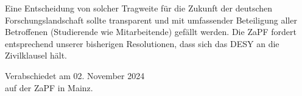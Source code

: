 \documentclass[DIV=calc]{scrartcl}
\begin{document}
Eine Entscheidung von solcher Tragweite für die Zukunft der deutschen Forschungslandschaft sollte transparent und mit umfassender Beteiligung aller Betroffenen (Studierende wie Mitarbeitende) gefällt werden. Die ZaPF fordert entsprechend unserer bisherigen Resolutionen, dass sich das DESY an die Zivilklausel hält.


%
\vfill
\begin{flushright}
	Verabschiedet am 02. November 2024 \\
	auf der ZaPF in Mainz.
\end{flushright}
\end{document}
